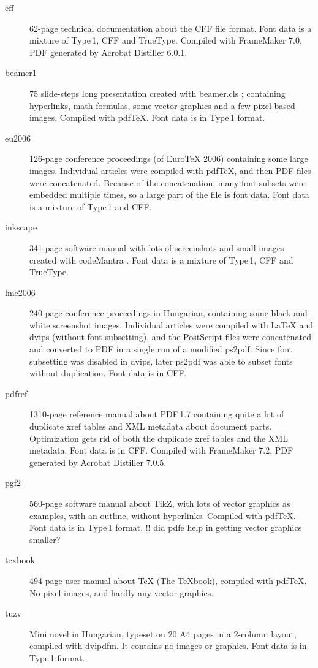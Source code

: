 \documentclass{ltugproc}
\def\cmd{\textsf}
\def\pkg{\textsf}
\begin{document}
\begin{description}

\item[cff] 62-page technical documentation about the CFF file format. Font
data is a mixture of Type\,1, CFF and TrueType. Compiled with FrameMaker
7.0, PDF generated by Acrobat Distiller 6.0.1. 

\item[beamer1] 75 slide-steps long presentation created with
\pkg{beamer.cls} \cite{beamer}; containing hyperlinks, math formulas, some
vector graphics and a few pixel-based images. Compiled with pdf\TeX{}.
Font data is in Type\,1 format.

\item[eu2006] 126-page conference proceedings (of Euro\TeX{} 2006)
containing some large images. Individual articles were compiled with
pdf\TeX{}, and then PDF files were concatenated. Because of the
concatenation, many font subsets were embedded multiple times, so a large
part of the file is font data. Font data is a mixture of Type\,1 and CFF.

\item[inkscape] 341-page software manual with lots of screenshots and small
images created with codeMantra \cite{codemantra}. Font data is a mixture of
Type\,1, CFF and TrueType.

\item[lme2006] 240-page conference proceedings in Hungarian, containing some
black-and-white screenshot images. Individual articles were compiled with
\LaTeX{} and \cmd{dvips} (without font subsetting), and the PostScript files
were concatenated and converted to PDF in a single run of a modified
\cmd{ps2pdf}. Since font subsetting was disabled in \cmd{dvips}, later
\cmd{ps2pdf} was able to subset fonts without duplication. Font data is in
CFF.

\item[pdfref] 1310-page reference manual about PDF\,1.7 containing quite a
lot of duplicate xref tables and XML metadata about document parts.
Optimization gets rid of both the duplicate xref tables and the XML
metadata. Font data is in CFF. Compiled with FrameMaker 7.2, PDF generated
by Acrobat Distiller 7.0.5.

\item[pgf2] 560-page software manual about TikZ, with lots of vector
graphics as examples, with an outline, without hyperlinks. Compiled with
pdf\TeX{}. Font data is in Type\,1 format.
!! did pdfe help in getting vector graphics smaller?

\item[texbook] 494-page user manual about \TeX{} (The \TeX{}book), compiled
with pdf\TeX{}. No pixel images, and hardly any vector graphics.

\item[tuzv] Mini novel in Hungarian, typeset on 20 A4 pages in a 2-column
layout, compiled with \cmd{dvipdfm}. It contains no images or graphics. Font data
is in Type\,1 format.

\end{description}
\end{document}
